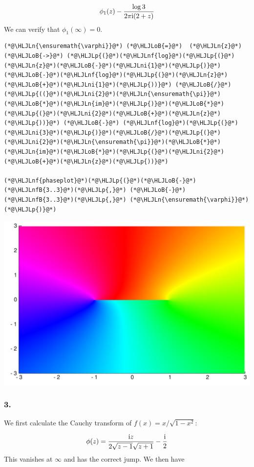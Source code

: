 \documentclass[12pt,a4paper]{article}
\newcommand{\HLJLn}[1]{#1}
\newcommand{\HLJLnf}[1]{\textcolor[RGB]{66,102,213}{#1}}
\newcommand{\HLJLnfB}[1]{\textcolor[RGB]{59,151,46}{#1}}
\newcommand{\HLJLni}[1]{\textcolor[RGB]{59,151,46}{#1}}
\newcommand{\HLJLoB}[1]{\textcolor[RGB]{102,102,102}{\textbf{#1}}}
\newcommand{\HLJLp}[1]{#1}
\def\I{ {\rm i} }
\begin{document}
\[
\phi_1(z) - {\log 3 \over 2 \pi \I (2+z)}
\]
We can verify that $\phi_1(\infty) = 0$.


\begin{lstlisting}
(*@\HLJLn{\ensuremath{\varphi}}@*) (*@\HLJLoB{=}@*)  (*@\HLJLn{z}@*) (*@\HLJLoB{->}@*) (*@\HLJLp{(}@*)(*@\HLJLnf{log}@*)(*@\HLJLp{(}@*)(*@\HLJLn{z}@*)(*@\HLJLoB{-}@*)(*@\HLJLni{1}@*)(*@\HLJLp{)}@*)(*@\HLJLoB{-}@*)(*@\HLJLnf{log}@*)(*@\HLJLp{(}@*)(*@\HLJLn{z}@*)(*@\HLJLoB{+}@*)(*@\HLJLni{1}@*)(*@\HLJLp{))}@*) (*@\HLJLoB{/}@*) (*@\HLJLp{((}@*)(*@\HLJLni{2}@*)(*@\HLJLn{\ensuremath{\pi}}@*)(*@\HLJLoB{*}@*)(*@\HLJLn{im}@*)(*@\HLJLp{)}@*)(*@\HLJLoB{*}@*)(*@\HLJLp{(}@*)(*@\HLJLni{2}@*)(*@\HLJLoB{+}@*)(*@\HLJLn{z}@*)(*@\HLJLp{))}@*) (*@\HLJLoB{-}@*) (*@\HLJLnf{log}@*)(*@\HLJLp{(}@*)(*@\HLJLni{3}@*)(*@\HLJLp{)}@*)(*@\HLJLoB{/}@*)(*@\HLJLp{(}@*)(*@\HLJLni{2}@*)(*@\HLJLn{\ensuremath{\pi}}@*)(*@\HLJLoB{*}@*)(*@\HLJLn{im}@*)(*@\HLJLoB{*}@*)(*@\HLJLp{(}@*)(*@\HLJLni{2}@*)(*@\HLJLoB{+}@*)(*@\HLJLn{z}@*)(*@\HLJLp{))}@*)

(*@\HLJLnf{phaseplot}@*)(*@\HLJLp{(}@*)(*@\HLJLoB{-}@*)(*@\HLJLnfB{3..3}@*)(*@\HLJLp{,}@*) (*@\HLJLoB{-}@*)(*@\HLJLnfB{3..3}@*)(*@\HLJLp{,}@*) (*@\HLJLn{\ensuremath{\varphi}}@*)(*@\HLJLp{)}@*)
\end{lstlisting}

\includegraphics[width=\linewidth]{figures/Solutions2_4_1.pdf}

\subsubsection{3.}
We first calculate the Cauchy transform of $f(x) = x/\sqrt{1-x^2}$:

\[
\phi(z) = {\I z  \over 2 \sqrt{z -1} \sqrt{z+1}} - {\I \over 2}
\]
This vanishes at $\infty$ and has the correct jump. We then have
\end{document}

